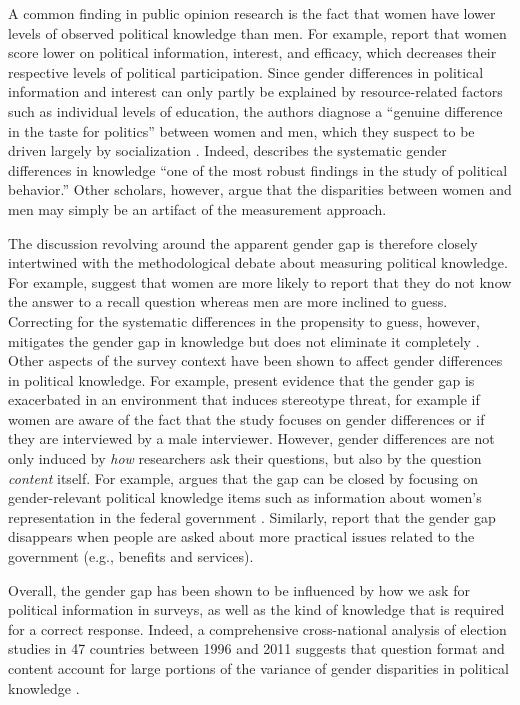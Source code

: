 A common finding in public opinion research is the fact that women have lower levels of observed political knowledge than men. For example, \citet{verba1997knowing} report that women score lower on political information, interest, and efficacy, which decreases their respective levels of political participation. Since gender differences in political information and interest can only partly be explained by resource-related factors such as individual levels of education, the authors diagnose a ``genuine difference in the taste for politics'' between women and men, which they suspect to be driven largely by socialization \citep[see also][]{wolak2011roots}. Indeed, \citet[117]{dow2009gender} describes the systematic gender differences in knowledge ``one of the most robust findings in the study of political behavior.'' Other scholars, however, argue that the disparities between women and men may simply be an artifact of the measurement approach.

The discussion revolving around the apparent gender gap is therefore closely intertwined with the methodological debate about measuring political knowledge. For example, \citet{mondak2004knowledge} suggest that women are more likely to report that they do not know the answer to a recall question whereas men are more inclined to guess. Correcting for the systematic differences in the propensity to guess, however, mitigates the gender gap in knowledge but does not eliminate it completely \citep[see also][]{lizotte2009explaining}. Other aspects of the survey context have been shown to affect gender differences in political knowledge. For example, \citet{mcglone2006stereotype} present evidence that the gender gap is exacerbated in an environment that induces stereotype threat, for example if women are aware of the fact that the study focuses on gender differences or if they are interviewed by a male interviewer. However, gender differences are not only induced by \textit{how} researchers ask their questions, but also by the question \textit{content} itself. For example, \citet{dolan2011women} argues that the gap can be closed by focusing on gender-relevant political knowledge items such as information about women's representation in the federal government \citep[see also][]{graber2001processing,fraile2014does,jerit2017revisiting}. Similarly, \citet{stolle2010women} report that the gender gap disappears when people are asked about more practical issues related to the government (e.g., benefits and services).

Overall, the gender gap has been shown to be influenced by how we ask for political information in surveys, as well as the kind of knowledge that is required for a correct response. Indeed, a comprehensive cross-national analysis of election studies in 47 countries between 1996 and 2011 suggests that question format and content account for large portions of the variance of gender disparities in political knowledge \citep{fortin2016cross}.


